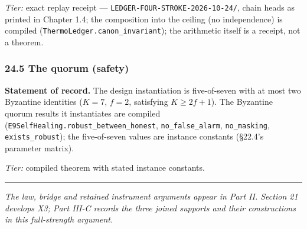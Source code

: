 \documentclass[
]{article}
\begin{document}
\emph{Tier:} exact replay receipt ---
\texttt{L\allowbreak{}E\allowbreak{}D\allowbreak{}G\allowbreak{}E\allowbreak{}R\allowbreak{}-\allowbreak{}F\allowbreak{}O\allowbreak{}U\allowbreak{}R\allowbreak{}-\allowbreak{}S\allowbreak{}T\allowbreak{}R\allowbreak{}O\allowbreak{}K\allowbreak{}E\allowbreak{}-\allowbreak{}2\allowbreak{}0\allowbreak{}2\allowbreak{}6\allowbreak{}-\allowbreak{}1\allowbreak{}0\allowbreak{}-\allowbreak{}2\allowbreak{}4\allowbreak{}/},
chain heads as printed in Chapter 1.4; the composition into the ceiling
(no independence) is compiled
(\texttt{T\allowbreak{}h\allowbreak{}e\allowbreak{}r\allowbreak{}m\allowbreak{}o\allowbreak{}L\allowbreak{}e\allowbreak{}d\allowbreak{}g\allowbreak{}e\allowbreak{}r\allowbreak{}.\allowbreak{}c\allowbreak{}a\allowbreak{}n\allowbreak{}o\allowbreak{}n\allowbreak{}\_\allowbreak{}i\allowbreak{}n\allowbreak{}v\allowbreak{}a\allowbreak{}r\allowbreak{}i\allowbreak{}a\allowbreak{}n\allowbreak{}t});
the arithmetic itself is a receipt, not a theorem.

\subsubsection{24.5 The quorum (safety)}\label{the-quorum-safety}

\textbf{Statement of record.} The design instantiation is five-of-seven
with at most two Byzantine identities (\(K = 7\), \(f = 2\), satisfying
\(K \ge 2f + 1\)). The Byzantine quorum results it instantiates are
compiled
(\texttt{E\allowbreak{}9\allowbreak{}S\allowbreak{}e\allowbreak{}l\allowbreak{}f\allowbreak{}H\allowbreak{}e\allowbreak{}a\allowbreak{}l\allowbreak{}i\allowbreak{}n\allowbreak{}g\allowbreak{}.\allowbreak{}r\allowbreak{}o\allowbreak{}b\allowbreak{}u\allowbreak{}s\allowbreak{}t\allowbreak{}\_\allowbreak{}b\allowbreak{}e\allowbreak{}t\allowbreak{}w\allowbreak{}e\allowbreak{}e\allowbreak{}n\allowbreak{}\_\allowbreak{}h\allowbreak{}o\allowbreak{}n\allowbreak{}e\allowbreak{}s\allowbreak{}t},
\texttt{no\_false\_alarm}, \texttt{no\_masking},
\texttt{exists\_robust}); the five-of-seven values are instance
constants (§22.4's parameter matrix).

\emph{Tier:} compiled theorem with stated instance constants.

\begin{center}\rule{0.5\linewidth}{0.5pt}\end{center}

\emph{The law, bridge and retained instrument arguments appear in Part
II. Section 21 develops X3; Part III-C records the three joined supports
and their constructions in this full-strength argument.}
\end{document}
